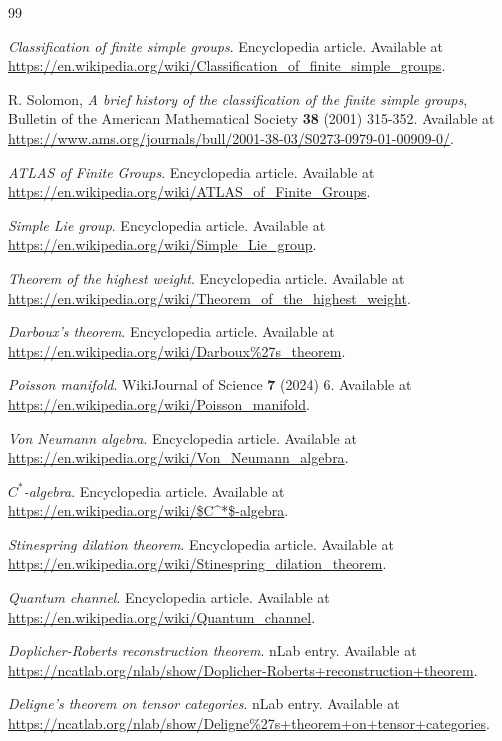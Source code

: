 \documentclass[11pt,letterpaper]{article}
\theoremstyle{definition}
\theoremstyle{remark}
\begin{document}
\begin{thebibliography}{99}

\emph{Classification of finite simple groups}. Encyclopedia article. Available at \url{https://en.wikipedia.org/wiki/Classification_of_finite_simple_groups}.

R. Solomon, \emph{A brief history of the classification of the finite simple groups}, Bulletin of the American Mathematical Society \textbf{38} (2001) 315-352. Available at \url{https://www.ams.org/journals/bull/2001-38-03/S0273-0979-01-00909-0/}.

\emph{ATLAS of Finite Groups}. Encyclopedia article. Available at \url{https://en.wikipedia.org/wiki/ATLAS_of_Finite_Groups}.

\emph{Simple Lie group}. Encyclopedia article. Available at \url{https://en.wikipedia.org/wiki/Simple_Lie_group}.

\emph{Theorem of the highest weight}. Encyclopedia article. Available at \url{https://en.wikipedia.org/wiki/Theorem_of_the_highest_weight}.

\emph{Darboux's theorem}. Encyclopedia article. Available at \url{https://en.wikipedia.org/wiki/Darboux%27s_theorem}.

\emph{Poisson manifold}. WikiJournal of Science \textbf{7} (2024) 6. Available at \url{https://en.wikipedia.org/wiki/Poisson_manifold}.

\emph{Von Neumann algebra}. Encyclopedia article. Available at \url{https://en.wikipedia.org/wiki/Von_Neumann_algebra}.

\emph{$C^*$-algebra}. Encyclopedia article. Available at \url{https://en.wikipedia.org/wiki/$C^*$-algebra}.

\emph{Stinespring dilation theorem}. Encyclopedia article. Available at \url{https://en.wikipedia.org/wiki/Stinespring_dilation_theorem}.

\emph{Quantum channel}. Encyclopedia article. Available at \url{https://en.wikipedia.org/wiki/Quantum_channel}.

\emph{Doplicher-Roberts reconstruction theorem}. nLab entry. Available at \url{https://ncatlab.org/nlab/show/Doplicher-Roberts+reconstruction+theorem}.

\emph{Deligne's theorem on tensor categories}. nLab entry. Available at \url{https://ncatlab.org/nlab/show/Deligne%27s+theorem+on+tensor+categories}.


\end{thebibliography}
\end{document}
